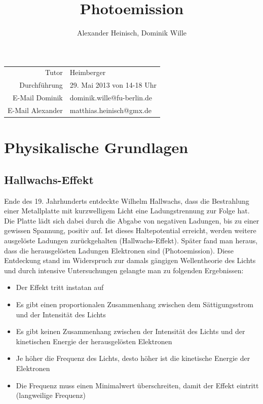 \documentclass{article}
\title{Photoemission}
\author{Alexander Heinisch, Dominik Wille}
\begin{document}
\maketitle
\vspace{13cm}
\noindent
\begin{center}
\begin{tabular}{r l}
Tutor & Heimberger\\
Durchführung & 29. Mai 2013 von 14-18 Uhr \\

E-Mail Dominik & dominik.wille@fu-berlin.de \\
E-Mail Alexander & matthias.heinisch@gmx.de \\
\end{tabular}
\end{center}

\newpage
\tableofcontents
\newpage

\section{Physikalische Grundlagen}

\subsection{Hallwachs-Effekt}
Ende des 19. Jahrhunderts entdeckte Wilhelm Hallwachs, dass die Bestrahlung einer Metallplatte mit kurzwelligem Licht eine Ladungstrennung zur Folge hat. Die Platte lädt sich dabei durch die Abgabe von negativen Ladungen, bis zu einer gewissen Spannung, positiv auf. Ist dieses Haltepotential erreicht, werden weitere ausgelöste Ladungen zurückgehalten (Hallwachs-Effekt). Später fand man heraus, dass die herausgelösten Ladungen Elektronen sind (Photoemission).
Diese Entdeckung stand im Widerspruch zur damals gängigen Wellentheorie des Lichts und durch intensive Untersuchungen gelangte man zu folgenden Ergebnissen:

\begin{itemize}
\item Der Effekt tritt instatan auf
\item Es gibt einen proportionalen Zusammenhang zwischen dem Sättigungsstrom und der Intensität des Lichts
\item Es gibt keinen Zusammenhang zwischen der Intensität des Lichts und der kinetischen Energie der herausgelösten Elektronen
\item Je höher die Frequenz des Lichts, desto höher ist die kinetische Energie der Elektronen
\item Die Frequenz muss einen Minimalwert überschreiten, damit der Effekt eintritt (langweilige Frequenz)
\end{itemize}
\end{document}
